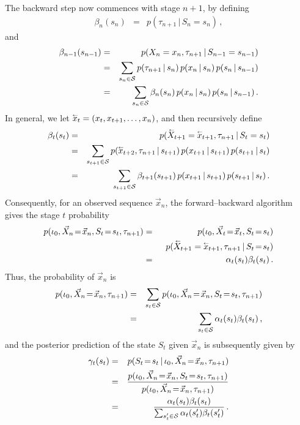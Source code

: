 \documentclass[a4paper]{article}
\newcommand{\rvec}[1]{\accentset{\leftarrow}{#1}}
\begin{document}
The backward step now commences with stage $n+1$, by defining
\begin{eqnarray}
  \beta_{n}(s_{n}) & = & p(\tau_{n+1}\,|\,S_n=s_{n})
\,,
\end{eqnarray}
and 
\begin{eqnarray}
  \beta_{n-1}(s_{n-1}) & = & p(X_n=x_{n},\tau_{n+1}\,|\,S_{n-1}=s_{n-1})
\nonumber\\
& = &
\sum_{s_n\in{\cal S}}p(\tau_{n+1}\,|\,s_{n})\,p(x_n\,|\,s_n)\,p(s_n\,|\,s_{n-1})
\nonumber\\
& = &
\sum_{s_n\in{\cal S}}\beta_n(s_{n})\,p(x_n\,|\,s_n)\,p(s_n\,|\,s_{n-1})
\,.
\end{eqnarray}
In general, we let $\rvec{x}_t=(x_t,x_{t+1},\ldots,x_n)$, and then recursively define
\begin{eqnarray}
  \beta_{t}(s_{t}) & = & p(\rvec{X}_{t+1}=\rvec{x}_{t+1},\tau_{n+1}\,|\,S_t=s_{t})
\nonumber\\
& = &
\sum_{s_{t+1}\in{\cal S}}
  p(\rvec{x}_{t+2},\tau_{n+1}\,|\,s_{t+1})\,p(x_{t+1}\,|\,s_{t+1})\,p(s_{t+1}\,|\,s_t)
\nonumber\\
& = &
\sum_{s_{t+1}\in{\cal S}}\beta_{t+1}(s_{t+1})\,p(x_{t+1}\,|\,s_{t+1})\,p(s_{t+1}\,|\,s_t)
\,.
\end{eqnarray}
Consequently, for an observed sequence $\vec{x}_n$,  the forward--backward algorithm 
gives the stage $t$ probability
\begin{eqnarray}
  p(\iota_0,\vec{X}_n\!=\!\vec{x}_n,S_t\!=\!s_t,\tau_{n+1}) & = & 
  p(\iota_0,\vec{X}_t\!=\!\vec{x}_t,S_t\!=\!s_t)
\nonumber\\&& 
\;\;p(\rvec{X}_{t+1}=\rvec{x}_{t+1},\tau_{n+1}\,|\,S_t\!=\!s_t)
\nonumber\\& = &
  \alpha_t(s_t)\beta_t(s_t)\,.
\end{eqnarray}
Thus, the probability of $\vec{x}_n$  is
\begin{eqnarray}
  p(\iota_0,\vec{X}_n\!=\!\vec{x}_n,\tau_{n+1}) & = & 
  \sum_{s_t\in{\cal S}}p(\iota_0,\vec{X}_n\!=\!\vec{x}_n,S_t\!=\!s_t,\tau_{n+1})
\nonumber\\& = &
  \sum_{s_t\in{\cal S}}\alpha_t(s_t)\beta_t(s_t)\,,
\end{eqnarray}
and the posterior prediction of the state $S_t$ given $\vec{x}_n$ is subsequently given by
\begin{eqnarray}
\gamma_t(s_t) & = &
  p(S_t\!=\!s_t\,|\,\iota_0,\vec{X}_n\!=\!\vec{x}_n,\tau_{n+1}) 
\nonumber\\& = & 
\frac{p(\iota_0,\vec{X}_n\!=\!\vec{x}_n,S_t\!=\!s_t,\tau_{n+1})}
       {p(\iota_0,\vec{X}_n\!=\!\vec{x}_n,\tau_{n+1})}
\nonumber\\& = &
\frac{\alpha_t(s_t)\beta_t(s_t)}{\sum_{s_t'\in{\cal S}}\alpha_t(s_t')\beta_t(s_t')}\,.
\end{eqnarray}
\end{document}
